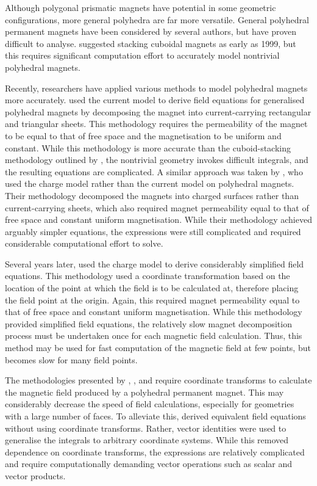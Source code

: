 Although polygonal prismatic magnets have potential in some geometric configurations, more general polyhedra are far more versatile. General polyhedral permanent magnets have been considered by several authors, but have proven difficult to analyse. \textcite{Bancel1999} suggested stacking cuboidal magnets as early as 1999, but this requires significant computation effort to accurately model nontrivial polyhedral magnets.

Recently, researchers have applied various methods to model polyhedral magnets more accurately. \textcite{Compter2010} used the current model to derive field equations for generalised polyhedral magnets by decomposing the magnet into current-carrying rectangular and triangular sheets. This methodology requires the permeability of the magnet to be equal to that of free space and the magnetisation to be uniform and constant. While this methodology is more accurate than the cuboid-stacking methodology outlined by \textcite{Bancel1999}, the nontrivial geometry invokes difficult integrals, and the resulting equations are complicated. A similar approach was taken by \textcite{Janssen2009,Janssen2010a}, who used the charge model rather than the current model on polyhedral magnets. Their methodology decomposed the magnets into charged surfaces rather than current-carrying sheets, which also required magnet permeability equal to that of free space and constant uniform magnetisation. While their methodology achieved arguably simpler equations, the expressions were still complicated and required considerable computational effort to solve.

Several years later, \textcite{Rubeck2013} used the charge model to derive considerably simplified field equations. This methodology used a coordinate transformation based on the location of the point at which the field is to be calculated at, therefore placing the field point at the origin. Again, this required magnet permeability equal to that of free space and constant uniform magnetisation. While this methodology provided simplified field equations, the relatively slow magnet decomposition process must be undertaken once for each magnetic field calculation. Thus, this method may be used for fast computation of the magnetic field at few points, but becomes slow for many field points.

The methodologies presented by \textcite{Compter2010}, \textcite{Janssen2009,Janssen2010a}, and \textcite{Rubeck2013} require coordinate transforms to calculate the magnetic field produced by a polyhedral permanent magnet. This may considerably decrease the speed of field calculations, especially for geometries with a large number of faces. To alleviate this, \textcite{Fabbri2008} derived equivalent field equations without using coordinate transforms. Rather, vector identities were used to generalise the integrals to arbitrary coordinate systems. While this removed dependence on coordinate transforms, the expressions are relatively complicated and require computationally demanding vector operations such as scalar and vector products.


